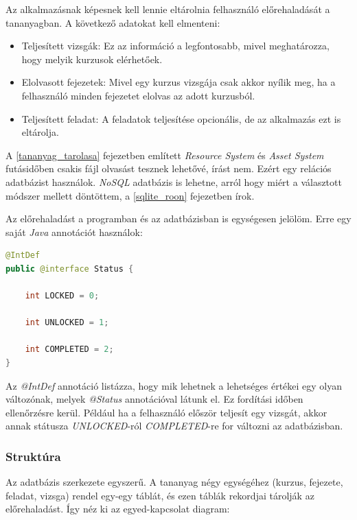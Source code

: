 \documentclass[12pt,a4paper]{article}
\begin{document}
	Az alkalmazásnak képesnek kell lennie eltárolnia felhasználó előrehaladását a tananyagban. A következő adatokat kell elmenteni:
	
	\begin{itemize}
		\item Teljesített vizsgák: Ez az információ a legfontosabb, mivel meghatározza, hogy melyik kurzusok elérhetőek.
		\item Elolvasott fejezetek: Mivel egy kurzus vizsgája csak akkor nyílik meg, ha a felhasználó minden fejezetet elolvas az adott kurzusból.
		\item Teljesített feladat: A feladatok teljesítése opcionális, de az alkalmazás ezt is eltárolja.
	\end{itemize}
	
	A \ref{tananyag_tarolasa} fejezetben említett \textit{Resource System} és \textit{Asset System} futásidőben csakis fájl olvasást tesznek lehetővé, írást nem. Ezért egy relációs adatbázist használok. \textit{NoSQL} adatbázis is lehetne, arról hogy miért a választott módszer mellett döntöttem, a \ref{sqlite_roon} fejezetben írok.
	
	Az előrehaladást a programban és az adatbázisban is egységesen jelölöm. Erre egy saját \textit{Java} annotációt használok:
	
	\begin{lstlisting}[language=Java]
@IntDef
public @interface Status {

	int LOCKED = 0;
		
	int UNLOCKED = 1;
		
	int COMPLETED = 2;
}
	\end{lstlisting}
	
	Az \textit{@IntDef} annotáció listázza, hogy mik lehetnek a lehetséges értékei egy olyan változónak, melyek \textit{@Status} annotációval látunk el. Ez fordítási időben ellenőrzésre kerül. Például ha a felhasználó először teljesít egy vizsgát, akkor annak státusza \textit{UNLOCKED}-ról \textit{COMPLETED}-re for változni az adatbázisban.
	 
	\subsubsection{Struktúra}\label{adatbazis_struktura}
	 
	Az adatbázis szerkezete egyszerű. A tananyag négy egységéhez (kurzus, fejezete, feladat, vizsga) rendel egy-egy táblát, és ezen táblák rekordjai tárolják az előrehaladást. Így néz ki az egyed-kapcsolat diagram:
	
\end{document}

